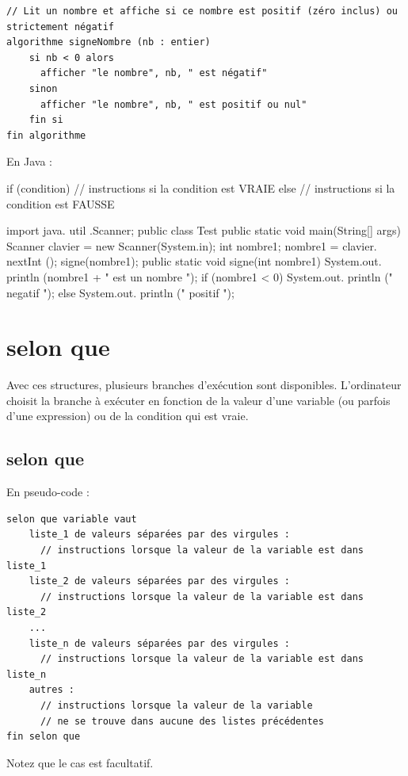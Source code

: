 \documentclass[11pt,a4paper]{article}
\begin{document}
            \par
        \begin{verbatim}
// Lit un nombre et affiche si ce nombre est positif (zéro inclus) ou strictement négatif
algorithme signeNombre (nb : entier)
    si nb < 0 alors
      afficher "le nombre", nb, " est négatif"
    sinon
      afficher "le nombre", nb, " est positif ou nul"
    fin si
fin algorithme
    \end{verbatim}En Java :
            \par
        \begin{Java}
if (condition) { 
      // instructions si la condition est VRAIE
} else { 
      // instructions si la condition est FAUSSE
} 
      \end{Java}\begin{Java}
import java. util .Scanner;
public class Test {
    public static void main(String[] args){
      Scanner clavier = new Scanner(System.in);
      int nombre1;
      nombre1 = clavier. nextInt ();
      signe(nombre1);
    }
    public static void signe(int nombre1) {
      System.out. println (nombre1 + " est un nombre ");
      if (nombre1 < 0) {
        System.out. println (" negatif ");
      } else {
        System.out. println (" positif ");
      }
    }
}
    \end{Java}\section{selon que}Avec ces structures, plusieurs branches d'ex\'ecution sont disponibles. L'ordinateur choisit la
    branche \`a ex\'ecuter en fonction de la valeur d'une variable (ou parfois d'une expression) ou
    de la condition qui est vraie.\subsection{selon que}En pseudo-code :
            \par
        \begin{verbatim}
selon que variable vaut
    liste_1 de valeurs séparées par des virgules :
      // instructions lorsque la valeur de la variable est dans liste_1
    liste_2 de valeurs séparées par des virgules :
      // instructions lorsque la valeur de la variable est dans liste_2
    ...
    liste_n de valeurs séparées par des virgules :
      // instructions lorsque la valeur de la variable est dans liste_n
    autres :
      // instructions lorsque la valeur de la variable
      // ne se trouve dans aucune des listes précédentes
fin selon que
      \end{verbatim}Notez que le cas \verb@autres@ est facultatif.
            \par
        
\end{document}
